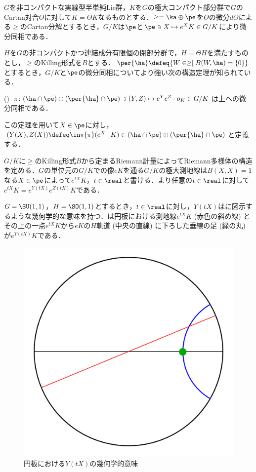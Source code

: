 $G$を非コンパクトな実線型半単純Lie群，$K$を$G$の極大コンパクト部分群で$G$のCartan対合$\Theta$に対して$K = \Theta K $なるものとする．$\ge = \ka \oplus \pe $を$\Theta$の微分$d\Theta$による$\ge$のCartan分解とするとき，$G/K$は$\pe$と$\pe \ni X\mapsto e^{X}K\in G/K $により微分同相である．

$H$を$G$の非コンパクトかつ連結成分有限個の閉部分群で，$H = \Theta H$を満たすものとし，$\ge$のKilling形式を$B$とする．$\per{\ha}\defeq \{W\in \ge\mid B(W, \ha) = \{0\} \} $とするとき，$G/K$と$\pe$の微分同相についてより強い次の構造定理が知られている．

\begin{thm*}(\cite[Lemma~6.1]{kob89})\label{thm:kob89-lem6.1}  
  $\pi\colon  (\ha\cap\pe)\oplus (\per{\ha}\cap \pe) \ni (Y, Z)\mapsto e^{Y}e^{Z}\cdot o_K \in G/K $は上への微分同相である．
\end{thm*}
この定理を用いて$X\in \pe$に対し，${(Y(X), Z(X))\defeq \inv{\pi}(e^X\cdot K)\in (\ha\cap\pe)\oplus (\per{\ha}\cap \pe)}$と定義する．

$G/K$に$\ge$のKilling形式$B$から定まるRiemann計量によってRiemann多様体の構造を定める．$G$の単位元の$G/K$での像$eK$を通る$G/K$の極大測地線は$B(X, X) = 1 $なる$X\in \pe$によって$e^{tX}K $，$t\in \real$と書ける．より任意の$t\in \real$に対して$e^{tX}K = e^{Y(tX)}e^{Z(tX)}K $である．

$G = \SU(1,1) $，$H = \SO(1,1) $とするとき，$t\in \real$に対し，$Y(tX) $はに図示するような幾何学的な意味を持つ．は{\Poincare}円板における測地線$e^{tX}K$ (赤色の斜め線) とその上の一点$e^{tX}K$から$eK$の$H$軌道 (中央の直線) に下ろした垂線の足 (緑の丸) が$e^{Y(tX)}K $である．
\begin{figure}[H]
  \centering
  \includegraphics[scale=0.3]{../graph/y-and-z.pdf}
  \caption{{\Poincare}円板における$Y(tX) $の幾何学的意味}
  \label{fig:y-and-z}
\end{figure}

